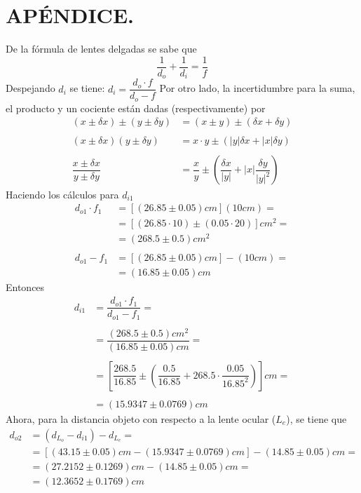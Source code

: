 \documentclass[10pt,a4paper]{article}
\begin{document}



\section{APÉNDICE.} %
\label{sec:apendice}
De la fórmula de lentes delgadas se sabe que 
$$\dfrac{1}{d_o}+\dfrac{1}{d_i}=\dfrac{1}{f}$$
Despejando $ d_i $ se tiene: \hspace{0.4cm} $d_i=\dfrac{d_o\cdot f}{d_o-f}$
Por otro lado, la incertidumbre para la suma, el producto y un cociente están dadas (respectivamente) por
\begin{align*}
	(x\pm \delta x)\pm(y\pm \delta y)&=(x\pm y)\pm(\delta x+\delta y)\\\\
	(x\pm\delta x)(y\pm\delta y)&=x\cdot y\pm\left(|y|\delta x+|x|\delta y \right)\\\\
	\dfrac{x\pm\delta x}{y\pm\delta y}&=\dfrac{x}{y}\pm\left(\dfrac{\delta x}{|y|}+|x|\dfrac{\delta y}{|y|^2}\right)
\end{align*}
Haciendo los cálculos para $ d_{i1} $
\begin{align*}
	d_{o1}\cdot f_1&=[(26.85\pm 0.05)cm](10cm)=\\	&=[(26.85\cdot10)\pm(0.05\cdot20)]cm^2=\\
	&=(268.5\pm0.5)cm^2\\\\
	d_{o1}-f_1&=[(26.85\pm 0.05)cm]-(10cm)=\\
	&=(16.85\pm0.05) cm
\end{align*}
Entonces
\begin{align*}
	d_{i1}&=\dfrac{d_{o1}\cdot f_1}{d_{o1}-f_1}=\\\\
	&=\dfrac{(268.5\pm0.5)cm^2}{(16.85\pm0.05) cm}=\\\\
	&=\left[\dfrac{268.5}{16.85}\pm\left(\dfrac{0.5}{16.85}+
	268.5\cdot\dfrac{0.05}{16.85^2}\right)\right]cm=\\\\
	&=(15.9347\pm0.0769)cm
\end{align*}
Ahora, para la distancia objeto con respecto a la lente ocular ($ L_e $), se tiene que
\begin{align*}
	d_{o2}&=(d_{L_o}-d_{i1})-d_{L_e}=\\
	&=[(43.15\pm0.05)cm-(15.9347\pm0.0769)cm]-(14.85\pm0.05)cm=\\
	&=(27.2152\pm0.1269)cm-(14.85\pm0.05)cm=\\
	&=(12.3652\pm0.1769)cm
\end{align*} 
\end{document}

